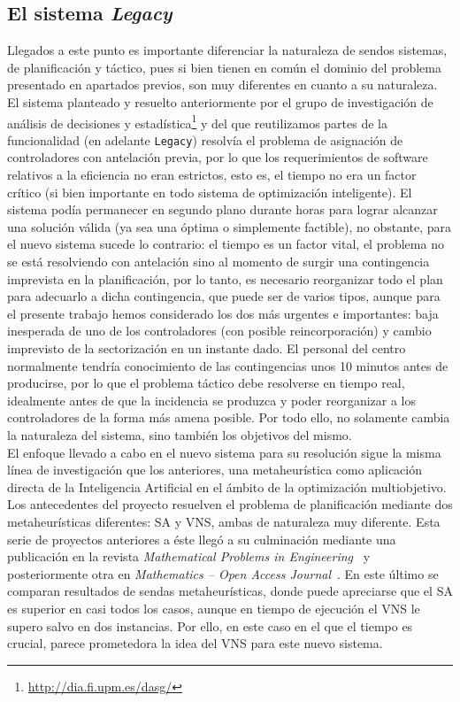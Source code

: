 \subsection{El sistema \textit{Legacy}}
\label{apartado:2:detalles-sistema}
Llegados a este punto es importante diferenciar la naturaleza de sendos sistemas, de planificación y táctico, pues si 
bien tienen en común el dominio del problema presentado en apartados previos, son muy diferentes en cuanto a su 
naturaleza.
\\

El sistema planteado y resuelto anteriormente por el grupo de investigación de análisis de decisiones y
estadística\footnote{\url{http://dia.fi.upm.es/dasg/}} y del que reutilizamos partes de la funcionalidad (en adelante
\texttt{Legacy}) resolvía el problema de asignación de controladores con antelación previa, por lo que los
requerimientos de software relativos a la eficiencia no eran estrictos, esto es, el tiempo no era un factor crítico (si
bien importante en todo sistema de optimización inteligente). El sistema podía permanecer en segundo plano durante
horas para lograr alcanzar una solución válida (ya sea una óptima o simplemente factible), no obstante, para el nuevo
sistema sucede lo contrario: el tiempo es un factor vital, el problema no se está resolviendo con antelación sino al
momento de surgir una contingencia imprevista en la planificación, por lo tanto, es necesario reorganizar todo el plan
para adecuarlo a dicha contingencia, que puede ser de varios tipos, aunque para el presente trabajo hemos considerado
los dos más urgentes e importantes: baja inesperada de uno de los controladores (con posible reincorporación) y cambio
imprevisto de la sectorización en un instante dado. El personal del centro normalmente tendría conocimiento de las
contingencias unos 10 minutos antes de producirse, por lo que el problema táctico debe resolverse en tiempo real,
idealmente antes de que la incidencia se produzca y poder reorganizar a los controladores de la forma más amena
posible.
Por todo ello, no solamente cambia la naturaleza del sistema, sino también los objetivos del mismo.
\\

El enfoque llevado a cabo en el nuevo sistema para su resolución sigue la misma línea de investigación que los 
anteriores, una metaheurística como aplicación directa de la Inteligencia Artificial en el ámbito de la optimización 
multiobjetivo.
Los antecedentes del proyecto resuelven el problema de planificación mediante dos metaheurísticas diferentes: 
\gls{SA} y \gls{VNS}, ambas de naturaleza muy diferente. 
Esta serie de proyectos anteriores a éste llegó a su culminación mediante una publicación en la revista 
\textit{Mathematical Problems in Engineering}~\cite{articulo1} y posteriormente otra en \textit{Mathematics -- Open 
Access Journal}~\cite{articulo2}. 
En este último se comparan resultados de sendas metaheurísticas, donde puede apreciarse que el SA es superior en casi 
todos los casos, aunque en tiempo de ejecución el VNS le supero salvo en dos instancias. Por ello, en este caso en el 
que el tiempo es crucial, parece prometedora la idea del VNS para este nuevo sistema. 
\\

